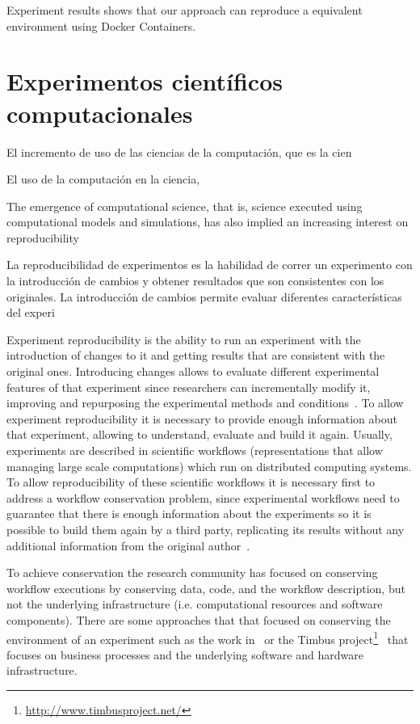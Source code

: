 Experiment results shows that our approach can reproduce a equivalent environment using Docker Containers.

\section{Experimentos científicos computacionales} 


El incremento de uso de las ciencias de la computación, que es la cien

El uso de la computación en la ciencia,



The emergence of computational science, that is, science executed using computational models and simulations, has also implied an increasing interest on reproducibility

La reproducibilidad de experimentos es la habilidad de correr un experimento con la introducción de cambios y obtener resultados que son consistentes con los originales. La introducción de cambios permite evaluar diferentes características del experi




Experiment reproducibility is the ability to run an experiment with the introduction of changes to it and getting results that are consistent with the original ones. Introducing changes allows to evaluate different experimental features of that experiment since researchers can incrementally modify it, improving and repurposing the experimental methods and conditions~\cite{stodden2010reproducible}.
To allow experiment reproducibility it is necessary to provide enough information about that experiment, allowing to understand, evaluate and build it again. Usually, experiments are described in scientific workflows (representations that allow managing large scale computations) which run on distributed computing systems. 
To allow reproducibility of these scientific workflows it is necessary first to address a workflow conservation problem, since experimental workflows need to guarantee that there is enough information about the experiments so it is possible to build them again by a third party, replicating its results without any additional information from the original author~\cite{garijo2013quantifying}. 

To achieve conservation the research community has focused on conserving workflow executions by conserving data, code, and the workflow description, but not the underlying infrastructure (i.e. computational resources and software components). There are some approaches that that focused on conserving the environment of an experiment such as the work in~\cite{santana2017reproducibility} or the Timbus project\footnote{\url{http://www.timbusproject.net/}}~\cite{dappert2013describing} that focuses on business processes and the underlying software and hardware infrastructure. 


